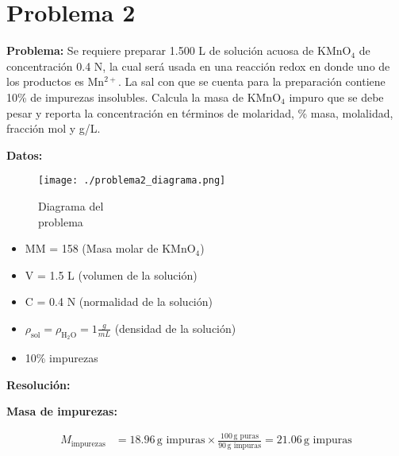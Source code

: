 \documentclass{article}
\begin{document}
\newpage
\section*{Problema 2}
\textbf{Problema:} Se requiere preparar 1.500 L de solución acuosa de KMnO$_4$ de concentración 0.4 N, la cual será usada en una reacción redox en donde uno de los productos es Mn$^{2+}$. La sal con que se cuenta para la preparación contiene 10\% de impurezas insolubles. Calcula la masa de KMnO$_4$ impuro que se debe pesar y reporta la concentración en términos de molaridad, \% masa, molalidad, fracción mol y g/L.

\noindent\textbf{Datos:} %

\begin{figure}[H]
    \begin{minipage}[t]{0.3\textwidth} %
        \raggedright %
        \texttt{[image: ./problema2\_diagrama.png]} %
        \caption{Diagrama del \\ problema}
    \end{minipage}
\end{figure}

\textbf{} %
\begin{itemize}
\item MM = 158 (Masa molar de KMnO$_4$)
\item V = 1.5 L (volumen de la solución)
\item C = 0.4 N (normalidad de la solución)
\item $\rho_{\text{sol}} = \rho_{\text{H}_2\text{O}} = 1 \frac{g}{mL}$ (densidad de la solución)
\item 10\% impurezas
\end{itemize}


\noindent\textbf{Resolución:} %

\textbf{Masa de impurezas:}

\begin{align*}
    M_{\text{impurezas}} &= 18.96 \, \text{g impuras} \times \frac{100 \, \text{g puras}}{90 \, \text{g impuras}} = 21.06 \, \text{g impuras}
\end{align*}
\end{document}
